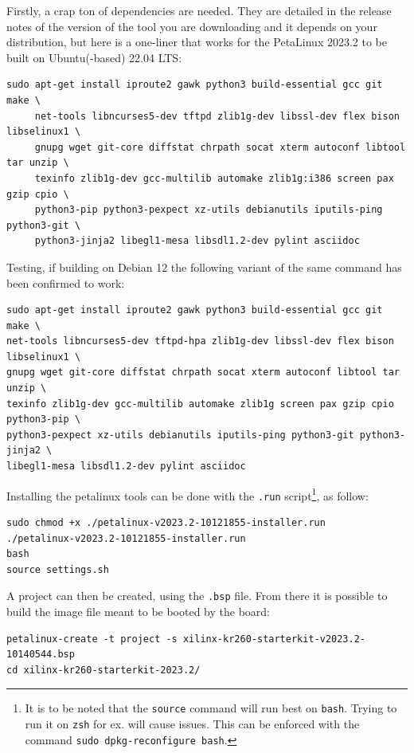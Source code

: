 \documentclass[10pt]{article}
\begin{document}
Firstly, a crap ton of dependencies are needed. They are detailed in the
release notes of the version of the tool you are downloading and it depends on
your distribution, but here is a one-liner that works for the PetaLinux 2023.2
to be built on Ubuntu(-based) 22.04 LTS:
\begin{verbatim}
sudo apt-get install iproute2 gawk python3 build-essential gcc git make \
     net-tools libncurses5-dev tftpd zlib1g-dev libssl-dev flex bison libselinux1 \
     gnupg wget git-core diffstat chrpath socat xterm autoconf libtool tar unzip \
     texinfo zlib1g-dev gcc-multilib automake zlib1g:i386 screen pax gzip cpio \
     python3-pip python3-pexpect xz-utils debianutils iputils-ping python3-git \
     python3-jinja2 libegl1-mesa libsdl1.2-dev pylint asciidoc
\end{verbatim}

Testing, if building on Debian 12 the following variant of the same command has been confirmed to work:
\begin{verbatim}
sudo apt-get install iproute2 gawk python3 build-essential gcc git make \
net-tools libncurses5-dev tftpd-hpa zlib1g-dev libssl-dev flex bison libselinux1 \
gnupg wget git-core diffstat chrpath socat xterm autoconf libtool tar unzip \
texinfo zlib1g-dev gcc-multilib automake zlib1g screen pax gzip cpio python3-pip \
python3-pexpect xz-utils debianutils iputils-ping python3-git python3-jinja2 \
libegl1-mesa libsdl1.2-dev pylint asciidoc
\end{verbatim}

Installing the petalinux tools can be done with the \texttt{.run} script\footnote{It is to be noted that the \texttt{source} command will run best on \texttt{bash}. Trying
to run it on \texttt{zsh} for ex. will cause issues. This can be enforced with the
command \texttt{sudo dpkg-reconfigure bash}.}, as follow:
\begin{verbatim}
sudo chmod +x ./petalinux-v2023.2-10121855-installer.run
./petalinux-v2023.2-10121855-installer.run
bash
source settings.sh
\end{verbatim}

A project can then be created, using the \texttt{.bsp} file. From there it is possible to
build the image file meant to be booted by the board:
\begin{verbatim}
petalinux-create -t project -s xilinx-kr260-starterkit-v2023.2-10140544.bsp
cd xilinx-kr260-starterkit-2023.2/
\end{verbatim}
\end{document}
